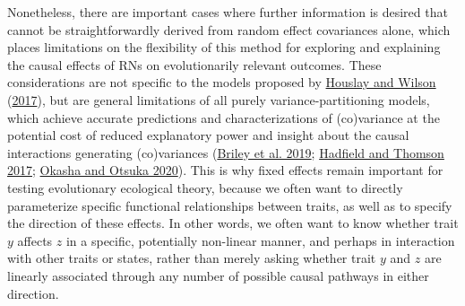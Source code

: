 \documentclass{article}
\begin{document}
Nonetheless, there are important cases where further information is
desired that cannot be straightforwardly derived from random effect
covariances alone, which places limitations on the flexibility of this
method for exploring and explaining the causal effects of RNs on
evolutionarily relevant outcomes. These considerations are not specific
to the models proposed by \protect\hyperlink{ref-Hous2017}{Houslay and
Wilson} (\protect\hyperlink{ref-Hous2017}{2017}), but are general
limitations of all purely variance-partitioning models, which achieve
accurate predictions and characterizations of (co)variance at the
potential cost of reduced explanatory power and insight about the causal
interactions generating (co)variances
(\protect\hyperlink{ref-Briley2019}{Briley et al. 2019};
\protect\hyperlink{ref-Hadfield2017}{Hadfield and Thomson 2017};
\protect\hyperlink{ref-Okasha2020}{Okasha and Otsuka 2020}). This is why
fixed effects remain important for testing evolutionary ecological
theory, because we often want to directly parameterize specific
functional relationships between traits, as well as to specify the
direction of these effects. In other words, we often want to know
whether trait \(y\) affects \(z\) in a specific, potentially non-linear
manner, and perhaps in interaction with other traits or states, rather
than merely asking whether trait \(y\) and \(z\) are linearly associated
through any number of possible causal pathways in either direction.
\end{document}
